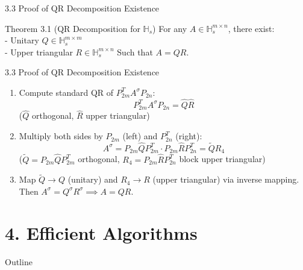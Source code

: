 \documentclass{beamer}
\begin{document}
\begin{frame}{3.3 Proof of QR Decomposition Existence}
  \begin{block}{Theorem 3.1 (QR Decomposition for $\mathbb{H}_s$)}
    For any $A \in \mathbb{H}_s^{m \times n}$, there exist:\\
    - Unitary $Q \in \mathbb{H}_s^{m \times m}$\\
    - Upper triangular $R \in \mathbb{H}_s^{m \times n}$
    Such that $A = QR$.
  \end{block}
\end{frame}
\begin{frame}{3.3 Proof of QR Decomposition Existence}
    \begin{enumerate}
    \item Compute standard QR of $P_{2m}^T A^\sigma P_{2n}$:
       \[
       P_{2m}^T A^\sigma P_{2n} = \hat{Q} \hat{R}
       \]
       ($\hat{Q}$ orthogonal, $\hat{R}$ upper triangular)
    \vspace{1em}

    \item Multiply both sides by $P_{2m}$ (left) and $P_{2n}^T$ (right):
       \[
       A^\sigma = P_{2m} \hat{Q} P_{2m}^T \cdot P_{2m} \hat{R} P_{2n}^T = \tilde{Q} R_4
       \]
       ($\tilde{Q} = P_{2m} \hat{Q} P_{2m}^T$ orthogonal, $R_4 = P_{2m} \hat{R} P_{2n}^T$ block upper triangular)
    \vspace{1em}

    \item Map $\tilde{Q} \to Q$ (unitary) and $R_4 \to R$ (upper triangular) via inverse mapping. Then $A^\sigma = Q^\sigma R^\sigma \implies A = QR$.
    \end{enumerate}
\end{frame}

\section{4. Efficient Algorithms}
\begin{frame}{Outline}
  \tableofcontents[sectionstyle=show/shaded, subsectionstyle=show/show/shaded]
\end{frame}
\end{document}
